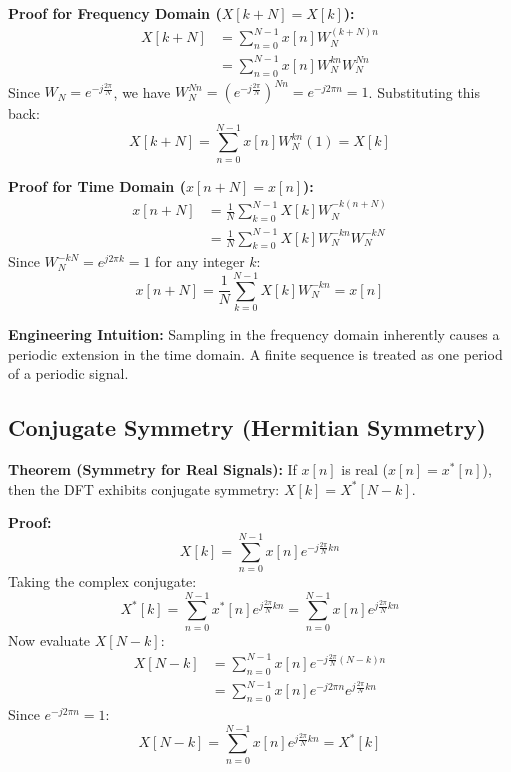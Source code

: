 \documentclass[11pt,a4paper]{article}
\begin{document}
\textbf{Proof for Frequency Domain ($X[k+N] = X[k]$):}
\begin{align}
X[k+N] &= \sum_{n=0}^{N-1} x[n] W_N^{(k+N)n} \\
&= \sum_{n=0}^{N-1} x[n] W_N^{kn} W_N^{Nn}
\end{align}
Since $W_N = e^{-j\frac{2\pi}{N}}$, we have $W_N^{Nn} = \left(e^{-j\frac{2\pi}{N}}\right)^{Nn} = e^{-j2\pi n} = 1$. Substituting this back:
\begin{equation}
X[k+N] = \sum_{n=0}^{N-1} x[n] W_N^{kn} (1) = X[k]
\end{equation}

\textbf{Proof for Time Domain ($x[n+N] = x[n]$):}
\begin{align}
x[n+N] &= \frac{1}{N} \sum_{k=0}^{N-1} X[k] W_N^{-k(n+N)} \\
&= \frac{1}{N} \sum_{k=0}^{N-1} X[k] W_N^{-kn} W_N^{-kN}
\end{align}
Since $W_N^{-kN} = e^{j2\pi k} = 1$ for any integer $k$:
\begin{equation}
x[n+N] = \frac{1}{N} \sum_{k=0}^{N-1} X[k] W_N^{-kn} = x[n]
\end{equation}

\textbf{Engineering Intuition:} Sampling in the frequency domain inherently causes a periodic extension in the time domain. A finite sequence is treated as one period of a periodic signal.

\subsection{Conjugate Symmetry (Hermitian Symmetry)}
\textbf{Theorem (Symmetry for Real Signals):} If $x[n]$ is real ($x[n] = x^*[n]$), then the DFT exhibits conjugate symmetry: $X[k] = X^*[N-k]$.

\textbf{Proof:}
\begin{equation}
X[k] = \sum_{n=0}^{N-1} x[n] e^{-j \frac{2\pi}{N} kn}
\end{equation}
Taking the complex conjugate:
\begin{equation}
X^*[k] = \sum_{n=0}^{N-1} x^*[n] e^{j \frac{2\pi}{N} kn} = \sum_{n=0}^{N-1} x[n] e^{j \frac{2\pi}{N} kn}
\end{equation}
Now evaluate $X[N-k]$:
\begin{align}
X[N-k] &= \sum_{n=0}^{N-1} x[n] e^{-j \frac{2\pi}{N} (N-k)n} \\
&= \sum_{n=0}^{N-1} x[n] e^{-j 2\pi n} e^{j \frac{2\pi}{N} kn}
\end{align}
Since $e^{-j 2\pi n} = 1$:
\begin{equation}
X[N-k] = \sum_{n=0}^{N-1} x[n] e^{j \frac{2\pi}{N} kn} = X^*[k]
\end{equation}
\end{document}
